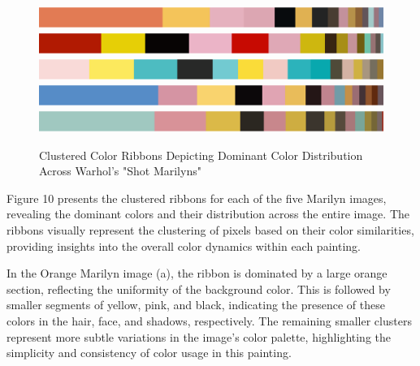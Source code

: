 \documentclass{article}
\begin{document}
\begin{figure}[htbp]
    \centering
        {\includegraphics[width=\textwidth]{main_files/figure-latex/7_1_orange_marilyn_color_ribbon.pdf}}
        {\includegraphics[width=\textwidth]{main_files/figure-latex/7_2_red_marilyn_color_ribbon.pdf}}
        {\includegraphics[width=\textwidth]{main_files/figure-latex/7_3_turq_marilyn_color_ribbon.pdf}}
        {\includegraphics[width=\textwidth]{main_files/figure-latex/7_4_blue_marilyn_color_ribbon.pdf}}
        {\includegraphics[width=\textwidth]{main_files/figure-latex/7_5_eggblue_marilyn_color_ribbon.pdf}}
    \caption{Clustered Color Ribbons Depicting Dominant Color Distribution Across Warhol's "Shot Marilyns"}
\end{figure}

Figure 10 presents the clustered ribbons for each of the five Marilyn
images, revealing the dominant colors and their distribution across the
entire image. The ribbons visually represent the clustering of pixels
based on their color similarities, providing insights into the overall
color dynamics within each painting.

In the Orange Marilyn image (a), the ribbon is dominated by a large
orange section, reflecting the uniformity of the background color. This
is followed by smaller segments of yellow, pink, and black, indicating
the presence of these colors in the hair, face, and shadows,
respectively. The remaining smaller clusters represent more subtle
variations in the image's color palette, highlighting the simplicity and
consistency of color usage in this painting.
\end{document}

